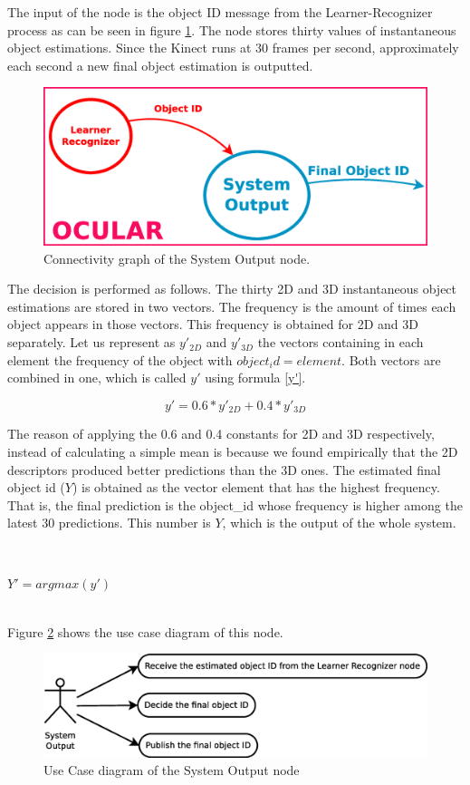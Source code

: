 	The input of the node is the object ID message from the Learner-Recognizer process as can be seen in figure \ref{node_output}.
	The node stores thirty values of instantaneous object estimations. 
	Since the Kinect runs at 30 frames per second, approximately each second a new final object estimation is outputted. 


		\begin{figure}[H]
			\begin{center}
			\includegraphics[width=0.5\linewidth]{img/diagrams/node_output.eps}
			\caption[System Output node I/O]{Connectivity graph of the System Output node.}		
			\label{node_output}
			\end{center}
		\end{figure}

	The decision is performed as follows. 
	The thirty 2D and 3D instantaneous object estimations are stored in two vectors. 
	The frequency is the amount of times each object appears in those vectors. 
	This frequency is obtained for 2D and 3D separately.  
	Let us represent as $y'_{2D}$ and $y'_{3D}$ the vectors containing in each element the frequency of the object with $object_id = element$. 
	Both vectors are combined in one, which is called $y'$ using formula \ref{y'}. 
	\begin{center}
	\begin{equation}
	\label{y'}
	y'=0.6*y'_{2D}+0.4*y'_{3D}
	\end{equation}
	\end{center}
	The reason of applying the 0.6 and 0.4 constants for 2D and 3D respectively, instead of calculating a simple mean is because we found empirically that the 2D descriptors produced better predictions than the 3D ones.
	The estimated final object id ($Y$) is obtained as the vector element that has the highest frequency. 
	That is, the final prediction is the object\_id whose frequency is higher among the latest 30 predictions.
	This number is $Y$, which is the output of the whole system. 

	\\
	\begin{center}
		$Y'= argmax(y')$
	\end{center} 
	\\
	Figure \ref{uc_output} shows the use case diagram of this node. 

	\begin{figure}[H]
		\centering
			\includegraphics[scale=0.4]{img/diagrams/uc_system_output.eps}
			\caption[Use case diagram System Output node]{Use Case diagram of the System Output node}
			\label{uc_output}
	\end{figure}